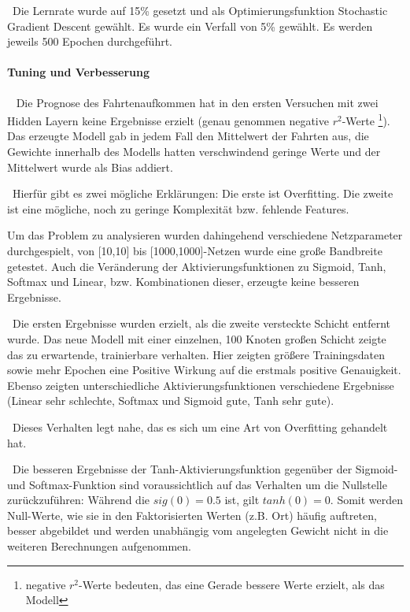 ~\newline Die Lernrate wurde auf 15\% gesetzt und als Optimierungsfunktion Stochastic Gradient Descent gewählt. Es wurde ein Verfall von 5\% gewählt. Es werden jeweils 500 Epochen durchgeführt. 
\paragraph{Tuning und Verbesserung} ~\newline
Die Prognose des Fahrtenaufkommen hat in den ersten Versuchen mit zwei Hidden Layern keine Ergebnisse erzielt (genau genommen negative $r^2$-Werte \footnote{negative $r^2$-Werte bedeuten, das eine Gerade bessere Werte erzielt, als das Modell}). Das erzeugte Modell gab in jedem Fall den Mittelwert der Fahrten aus, die Gewichte innerhalb des Modells hatten verschwindend geringe Werte und der Mittelwert wurde als Bias addiert. 


~\newline Hierfür gibt es zwei mögliche Erklärungen: Die erste ist Overfitting. Die zweite ist eine mögliche, noch zu geringe Komplexität bzw. fehlende Features. 

Um das Problem zu analysieren wurden dahingehend verschiedene Netzparameter durchgespielt, von [10,10] bis [1000,1000]-Netzen wurde eine große Bandbreite getestet. Auch die Veränderung der Aktivierungsfunktionen zu Sigmoid, Tanh, Softmax und Linear, bzw. Kombinationen dieser, erzeugte keine besseren Ergebnisse. 

~\newline Die ersten Ergebnisse wurden erzielt, als die zweite versteckte Schicht entfernt wurde. Das neue Modell mit einer einzelnen, 100 Knoten großen Schicht zeigte das zu erwartende, trainierbare verhalten. Hier zeigten größere Trainingsdaten sowie mehr Epochen eine Positive Wirkung auf die erstmals positive Genauigkeit. Ebenso zeigten unterschiedliche Aktivierungsfunktionen verschiedene Ergebnisse (Linear sehr schlechte, Softmax und Sigmoid gute, Tanh sehr gute). 

~\newline Dieses Verhalten legt nahe, das es sich um eine Art von Overfitting gehandelt hat. 

~\newline Die besseren Ergebnisse der Tanh-Aktivierungsfunktion gegenüber der Sigmoid- und Softmax-Funktion sind voraussichtlich auf das Verhalten um die Nullstelle zurückzuführen: Während die $sig(0)=0.5$ ist, gilt $tanh(0)=0$. Somit werden Null-Werte, wie sie in den Faktorisierten Werten (z.B. Ort) häufig auftreten, besser abgebildet und werden unabhängig vom angelegten Gewicht nicht in die weiteren Berechnungen aufgenommen. 


